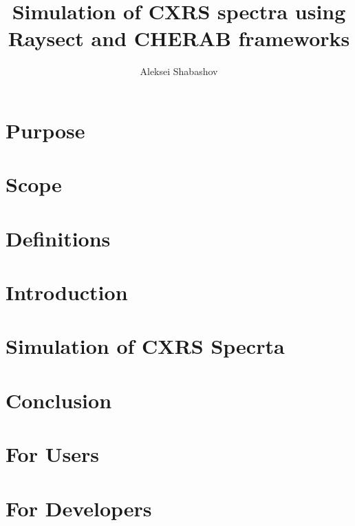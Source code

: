 \documentclass[a4paper,12pt,titlepage,english,draft]{article}
\title{Simulation of CXRS spectra using Raysect and CHERAB frameworks}
\author{Aleksei Shabashov}
\date{}
\begin{document}
\maketitle
\tableofcontents%

\section{Purpose}%
\label{sec:purpose}


\section{Scope}%
\label{sec:scope}


\section{Definitions}%
\label{sec:definitions}


\section{Introduction}%
\label{sec:introduction}


\section{Simulation of CXRS Specrta}%
\label{sec:simulation}


\section{Conclusion}%
\label{sec:conclusion}


\printbibliography%

\begin{appendices}
    \section{For Users}%
    \label{app:users}
    

    \section{For Developers}%
    \label{app:developers}
    
\end{appendices}
\end{document}
